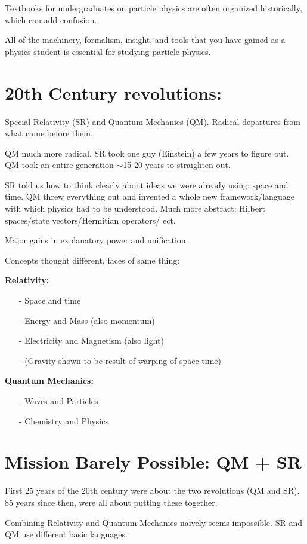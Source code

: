 {Textbooks for undergraduates on particle physics are often organized historically, which can add confusion. 

All of the machinery, formalism, insight, and tools that you have gained as a physics student is essential for studying particle physics.


\section{20th Century revolutions:}
Special Relativity (SR) and Quantum Mechanics (QM).
Radical departures from what came before them.

QM much more radical. 
SR took one guy (Einstein) a few years to figure out. 
QM took an entire generation $\sim$15-20 years to straighten out. 

SR told us how to think clearly about ideas we were already using: space and time. 
QM threw everything out and invented a whole new framework/language with which physics had to be understood.
Much more abstract: Hilbert spaces/state vectors/Hermitian operators/ ect.

Major gains in explanatory power and unification.

Concepts thought different, faces of same thing:

\textbf{Relativity:}
\begin{itemize}
\item[-] Space and time
\item[-] Energy and Mass (also momentum)
\item[-] Electricity and Magnetism (also light)
\item[-] (Gravity shown to be result of warping of space time)
\end{itemize}

\textbf{Quantum Mechanics:}
\begin{itemize}
\item[-] Waves and Particles
\item[-] Chemistry and Physics
\end{itemize}

\section{Mission Barely Possible: QM + SR}
First 25 years of the 20th century were about the two revolutions (QM and SR).
85 years since then, were all about putting these together.

Combining Relativity and Quantum Mechanics naively seems impossible. 
SR and QM use different basic languages. 

}
